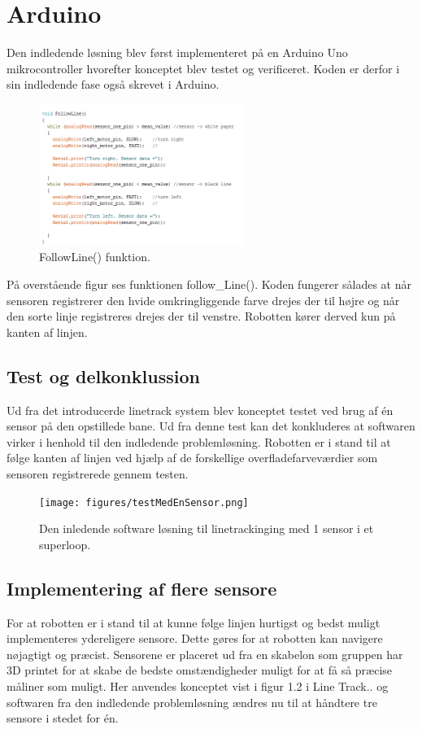 \section{Arduino}
Den indledende løsning blev først implementeret på en Arduino Uno mikrocontroller hvorefter konceptet blev testet og verificeret. Koden er derfor i sin indledende fase også skrevet i Arduino.

\begin{figure}[h!]
  \centering
  \includegraphics[width=0.6\textwidth]{figures/followLine2.png}
  \caption{FollowLine() funktion.}
  \label{follow_line_kode}
\end{figure}

På overstående figur ses funktionen follow\_Line(). Koden fungerer sålades at når sensoren registrerer den hvide omkringliggende farve drejes der til højre og når den sorte linje registreres drejes der til venstre. Robotten kører derved kun på kanten af linjen. 

\subsection{Test og delkonklussion}
Ud fra det introducerde linetrack system blev konceptet testet ved brug af én sensor på den opstillede bane. 
\newline
Ud fra denne test kan det konkluderes at softwaren virker i henhold til den indledende problemløsning. Robotten er i stand til at følge kanten af linjen ved hjælp af de forskellige overfladefarveværdier som sensoren registrerede gennem testen. 
\newline

\begin{figure}[h!]
  \centering
  \texttt{[image: figures/testMedEnSensor.png]}
  \caption{Den inledende software løsning til linetrackinging med 1 sensor i et superloop.}
  \label{init_software}
\end{figure}

\subsection*{Implementering af flere sensore}
For at robotten er i stand til at kunne følge linjen hurtigst og bedst muligt implementeres ydereligere sensore. Dette gøres for at robotten kan navigere nøjagtigt og præcist. Sensorene er placeret ud fra en skabelon som gruppen har 3D printet for at skabe de bedste omstændigheder muligt for at få så præcise måliner som muligt.
\newline 
Her anvendes konceptet vist i figur 1.2 i Line Track..  og softwaren fra den indledende problemløsning ændres nu til at håndtere tre sensore i stedet for én. 

